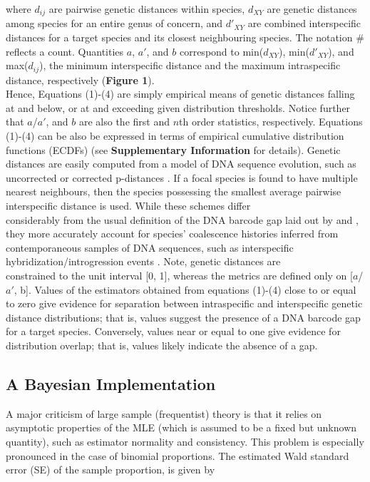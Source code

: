 \documentclass[12pt]{article}
\begin{document}
\noindent where $d_{ij}$ are pairwise genetic distances within species, $d_{XY}$ are genetic distances among species for an entire genus of concern, and $d'_{XY}$ are combined interspecific distances for a target species and its closest neighbouring species. The notation \# reflects a count.  Quantities $a$, $a'$, and $b$ correspond to min($d_{XY}$), min($d'_{XY}$), and max($d_{ij}$), the minimum interspecific distance and the maximum intraspecific distance, respectively (\textbf{Figure 1}). \\ Hence, Equations (1)-(4) are simply empirical means of genetic distances falling at and below, or at and exceeding given distribution thresholds. Notice further that $a$/$a'$, and $b$ are also the first and $n$th order statistics, respectively. Equations (1)-(4) can be also be expressed in terms of empirical cumulative distribution functions (ECDFs) (see \textbf{Supplementary Information} for details). Genetic distances are easily computed from a model of DNA sequence evolution, such as uncorrected or corrected p-distances \citep{jukes1969evolution, kimura1980simple}. If a focal species is found to have multiple nearest neighbours, then the species possessing the smallest average pairwise interspecific distance is used. While these schemes differ \\ considerably from the usual definition of the DNA barcode gap laid out by \citet{meyer2005dna} and \citet{meier2008use}, they more accurately account for species' coalescence histories inferred from contemporaneous samples of DNA sequences, such as interspecific hybridization/introgression events \citep{phillips2024measure}. Note, genetic distances are \\ constrained to the unit interval [0, 1], whereas the metrics are defined only on [$a$/$a'$, b]. Values of the estimators obtained from equations (1)-(4) close to or equal to zero give evidence for separation between intraspecific and interspecific genetic distance distributions; that is, values suggest the presence of a DNA barcode gap for a target species. Conversely, values near or equal to one give evidence for distribution overlap; that is, values likely indicate the absence of a gap. 

\subsection{A Bayesian Implementation}

A major criticism of large sample (frequentist) theory is that it relies on asymptotic properties of the MLE (which is assumed to be a fixed but unknown quantity), such as estimator normality and consistency. This problem is especially pronounced in the case of binomial proportions. The estimated Wald standard error (SE) of the sample proportion, is given by 
\end{document}
